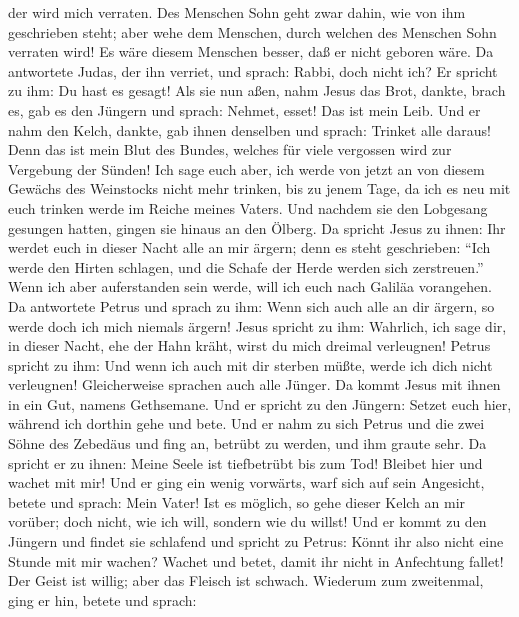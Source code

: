 der wird mich verraten.  Des Menschen Sohn geht zwar
dahin, wie von ihm geschrieben steht; aber wehe dem Menschen, durch
welchen des Menschen Sohn verraten wird! Es wäre diesem Menschen besser,
daß er nicht geboren wäre.  Da antwortete Judas, der ihn
verriet, und sprach: Rabbi, doch nicht ich? Er spricht zu ihm: Du hast
es gesagt!  Als sie nun aßen, nahm Jesus das Brot,
dankte, brach es, gab es den Jüngern und sprach: Nehmet, esset! Das ist
mein Leib.  Und er nahm den Kelch, dankte, gab ihnen
denselben und sprach: Trinket alle daraus!  Denn das ist
mein Blut des Bundes, welches für viele vergossen wird zur Vergebung der
Sünden!  Ich sage euch aber, ich werde von jetzt an von
diesem Gewächs des Weinstocks nicht mehr trinken, bis zu jenem Tage, da
ich es neu mit euch trinken werde im Reiche meines Vaters.
 Und nachdem sie den Lobgesang gesungen hatten, gingen
sie hinaus an den Ölberg.  Da spricht Jesus zu ihnen: Ihr
werdet euch in dieser Nacht alle an mir ärgern; denn es steht
geschrieben: ``Ich werde den Hirten schlagen, und die Schafe der Herde
werden sich zerstreuen.''  Wenn ich aber auferstanden
sein werde, will ich euch nach Galiläa vorangehen.  Da
antwortete Petrus und sprach zu ihm: Wenn sich auch alle an dir ärgern,
so werde doch ich mich niemals ärgern!  Jesus spricht zu
ihm: Wahrlich, ich sage dir, in dieser Nacht, ehe der Hahn kräht, wirst
du mich dreimal verleugnen!  Petrus spricht zu ihm: Und
wenn ich auch mit dir sterben müßte, werde ich dich nicht verleugnen!
Gleicherweise sprachen auch alle Jünger.  Da kommt Jesus
mit ihnen in ein Gut, namens Gethsemane. Und er spricht zu den Jüngern:
Setzet euch hier, während ich dorthin gehe und bete.  Und
er nahm zu sich Petrus und die zwei Söhne des Zebedäus und fing an,
betrübt zu werden, und ihm graute sehr.  Da spricht er zu
ihnen: Meine Seele ist tiefbetrübt bis zum Tod! Bleibet hier und wachet
mit mir!  Und er ging ein wenig vorwärts, warf sich auf
sein Angesicht, betete und sprach: Mein Vater! Ist es möglich, so gehe
dieser Kelch an mir vorüber; doch nicht, wie ich will, sondern wie du
willst!  Und er kommt zu den Jüngern und findet sie
schlafend und spricht zu Petrus: Könnt ihr also nicht eine Stunde mit
mir wachen?  Wachet und betet, damit ihr nicht in
Anfechtung fallet! Der Geist ist willig; aber das Fleisch ist schwach.
 Wiederum zum zweitenmal, ging er hin, betete und sprach:
